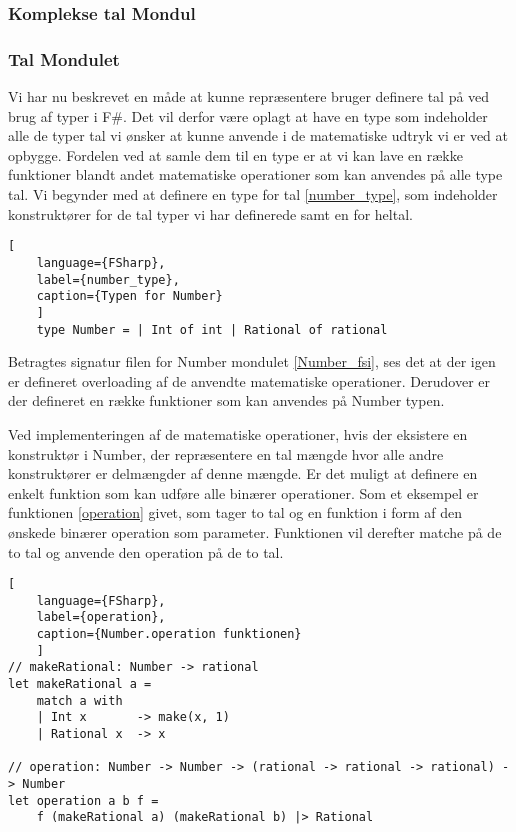 \documentclass{article}
\begin{document}
\subsubsection{Komplekse tal Mondul}

\subsubsection{Tal Mondulet}
Vi har nu beskrevet en måde at kunne repræsentere bruger definere tal på ved brug af typer i F\#. Det vil derfor være oplagt at have en type som indeholder alle de typer tal vi ønsker at kunne anvende i de matematiske udtryk vi er ved at opbygge. Fordelen ved at samle dem til en type er at vi kan lave en række funktioner blandt andet matematiske operationer som kan anvendes på alle type tal. Vi begynder med at definere en type for tal \ref{number_type}, som indeholder konstruktører for de tal typer vi har definerede samt en for heltal. 

\begin{lstlisting}[
    language={FSharp}, 
    label={number_type}, 
    caption={Typen for Number}
    ]
    type Number = | Int of int | Rational of rational
\end{lstlisting}

Betragtes signatur filen for Number mondulet \ref{Number_fsi}, ses det at der igen er defineret overloading af de anvendte matematiske operationer. Derudover er der defineret en række funktioner som kan anvendes på Number typen. 



Ved implementeringen af de matematiske operationer, hvis der eksistere en konstruktør i Number, der repræsentere en tal mængde hvor alle andre konstruktører er delmængder af denne mængde. Er det muligt at definere en enkelt funktion som kan udføre alle binærer operationer. Som et eksempel er funktionen \ref{operation} givet, som tager to tal og en funktion i form af den ønskede binærer operation som parameter. Funktionen vil derefter matche på de to tal og anvende den operation på de to tal. 

\begin{lstlisting}[
    language={FSharp},
    label={operation}, 
    caption={Number.operation funktionen}
    ]
// makeRational: Number -> rational
let makeRational a =
    match a with
    | Int x       -> make(x, 1)
    | Rational x  -> x

// operation: Number -> Number -> (rational -> rational -> rational) -> Number
let operation a b f =
    f (makeRational a) (makeRational b) |> Rational
\end{lstlisting}
\end{document}
